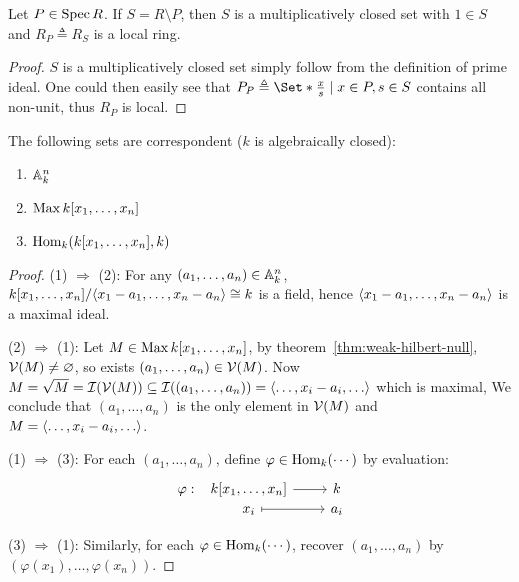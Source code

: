\begin{example}
  Let $P \in \operatorname{Spec} R$. If $S = R \setminus P$, then $S$ is a multiplicatively
  closed set with $1 \in S$ and $R_P \triangleq R_S$ is a local ring.

  \begin{proof}
    $S$ is a multiplicatively closed set simply follow from the definition of prime ideal.
    One could then easily see that $P_P \triangleq \Set*{\frac{x}{s} \mid x \in P, s \in S}$
    contains all non-unit, thus $R_P$ is local.
  \end{proof}
\end{example}


\begin{prop}
  The following sets are correspondent ($k$ is algebraically closed):
  \begin{enumerate}[(1)]
    \item $\mathbb{A}_k^n$
    \item $\operatorname{Max} k[x_1, \dots, x_n]$
    \item $\operatorname{Hom}_k(k[x_1, \dots, x_n], k)$
  \end{enumerate}
  \begin{proof}
    (1) $\Rightarrow$ (2): For any $(a_1, \dots, a_n) \in \mathbb{A}_k^n$,
    $k[x_1, \dots, x_n] / \langle x_1 - a_1, \dots, x_n - a_n\rangle \cong k$ is a field,
    hence $\langle x_1 - a_1, \dots, x_n - a_n\rangle$ is a maximal ideal.

    (2) $\Rightarrow$ (1): Let $M \in \operatorname{Max} k[x_1, \dots, x_n]$,
    by theorem~\ref{thm:weak-hilbert-null}, $\mathcal{V}(M) \neq \varnothing$,
    so exists $(a_1, \dots, a_n) \in \mathcal{V}(M)$.
    Now $M = \sqrt{M} = \Ic(\Vc(M)) \subseteq \Ic((a_1, \dots, a_n)) = \gen{\dots, x_i - a_i, \dots}$
    which is maximal,
    We conclude that $(a_1, \dots, a_n)$ is the only element in $\mathcal{V}(M)$
    and $M = \gen{\dots, x_i - a_i, \dots}$.

    (1) $\Rightarrow$ (3): For each $(a_1, \dots, a_n)$, define $\varphi \in \operatorname{Hom}_k(\dotsm)$ by
    evaluation:
    \[
      \begin{tikzcd}[column sep=0.8cm,row sep=0ex]
        \varphi: &[-0.7cm] k[x_1, \dots, x_n] \arrow[r] & k \\
        & x_i \arrow[r, mapsto] & a_i
      \end{tikzcd}
    \]

    (3) $\Rightarrow$ (1): Similarly, for each $\varphi \in \operatorname{Hom}_k(\dotsm)$,
    recover $(a_1, \dots, a_n)$ by $(\varphi(x_1), \dots, \varphi(x_n))$.
  \end{proof}
\end{prop}


